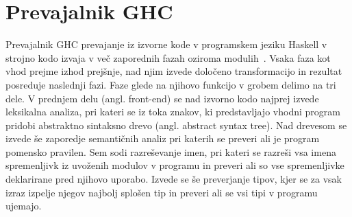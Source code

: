 \section{Prevajalnik GHC}
\label{sec:prevajalnik-ghc}

Prevajalnik GHC prevajanje iz izvorne kode v programskem jeziku Haskell v strojno kodo izvaja v več zaporednih fazah oziroma modulih~\cite{jones1993glasgow, brown2012architecture}. Vsaka faza kot vhod prejme izhod prejšnje, nad njim izvede določeno transformacijo in rezultat posreduje naslednji fazi. Faze glede na njihovo funkcijo v grobem delimo na tri dele. V prednjem delu (angl. front-end) se nad izvorno kodo najprej izvede leksikalna analiza, pri kateri se iz toka znakov, ki predstavljajo vhodni program pridobi abstraktno sintaksno drevo (angl. abstract syntax tree). Nad drevesom se izvede še zaporedje semantičnih analiz pri katerih se preveri ali je program pomensko pravilen. Sem sodi razreševanje imen, pri kateri se razreši vsa imena spremenljivk iz uvoženih modulov v programu in preveri ali so vse spremenljivke deklarirane pred njihovo uporabo. Izvede se še preverjanje tipov, kjer se za vsak izraz izpelje njegov najbolj splošen tip in preveri ali se vsi tipi v programu ujemajo.

